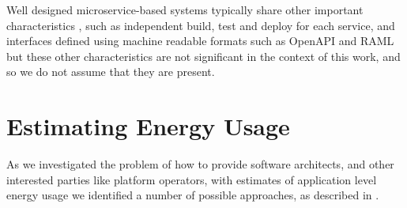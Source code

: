 Well designed microservice-based systems typically share other important characteristics \cite{newman2015_microservices}, such as independent build, test and deploy for each service, and interfaces defined using machine readable formats such as OpenAPI \cite{openapi2018} and RAML \cite{raml2018} but these other characteristics are not significant in the context of this work, and so we do not assume that they are present.

\section{Estimating Energy Usage}

As we investigated the problem of how to provide software architects, and other interested parties like platform operators, with estimates of application level energy usage we identified a number of possible approaches, as described in .  

